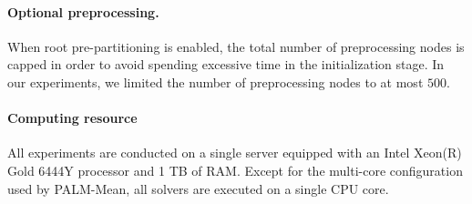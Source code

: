 \documentclass[pdflatex,sn-mathphys-num]{sn-jnl}%
\theoremstyle{thmstyleone}%
\theoremstyle{thmstyletwo}%
\theoremstyle{thmstylethree}%
\begin{document}
\paragraph{Optional preprocessing.}
When root pre-partitioning is enabled, the total number of preprocessing nodes is capped in order to avoid spending excessive time in the initialization stage. In our experiments, we limited the number of preprocessing nodes to at most $500$.

\paragraph{Computing resource}
All experiments are conducted on a single server equipped with an Intel Xeon(R) Gold 6444Y processor and 1 TB of RAM. Except for the multi-core configuration used by PALM-Mean, all solvers are executed on a single CPU core.




\end{document}

